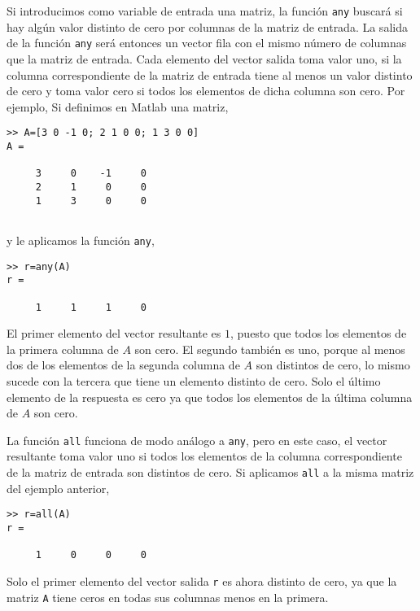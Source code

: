 Si introducimos como variable de entrada una matriz, la función \texttt{any} buscará si hay algún valor distinto de cero por columnas de la matriz de entrada. 
La salida de la función \texttt{any} será entonces un vector fila con el mismo número de columnas que la matriz de entrada. Cada elemento del vector salida toma valor uno,  si la columna correspondiente de la matriz de entrada tiene al menos un valor distinto de cero y toma valor cero si todos los elementos de dicha columna son cero. Por ejemplo, Si definimos en Matlab una matriz,
\begin{verbatim}
>> A=[3 0 -1 0; 2 1 0 0; 1 3 0 0]
A =

     3     0    -1     0
     2     1     0     0
     1     3     0     0


\end{verbatim}  

y le aplicamos la función \texttt{any},

\begin{verbatim}
>> r=any(A)
r =

     1     1     1     0

\end{verbatim}

El primer elemento del vector resultante es $1$, puesto que todos los elementos de la primera columna de $A$ son cero. El segundo también es uno, porque al menos dos de los elementos de la segunda columna de $A$ son distintos de cero, lo mismo sucede con la tercera que tiene un elemento distinto de cero. Solo el último elemento de la respuesta es cero ya que todos los elementos de la última columna de $A$ son cero.

La función \texttt{all} funciona de modo análogo a \texttt{any}, pero en este caso, el vector resultante toma valor uno si todos los elementos de la columna correspondiente de la matriz de entrada son distintos de cero. Si aplicamos \texttt{all} a la misma matriz del ejemplo anterior,

\begin{verbatim}
>> r=all(A)
r =

     1     0     0     0
\end{verbatim} 

Solo el primer elemento del vector salida \texttt{r} es ahora distinto de cero, ya que la matriz \texttt{A} tiene ceros en todas sus columnas menos en la primera.

